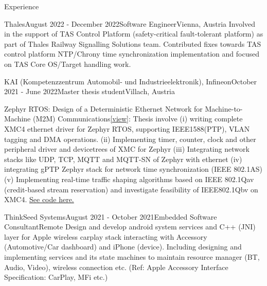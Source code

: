 \documentclass[
	a4paper, %
	11pt, %
]{resume} %
\begin{document}

\begin{rSection}{Experience}

    \begin{rSubsection}{Thales}{August 2022 - December 2022}{Software Engineer}{Vienna, Austria}
        Involved in the support of TAS Control Platform (safety-critical fault-tolerant platform) as part 
        of Thales Railway Signalling Solutions team. Contributed fixes towards TAS control platform NTP/Chrony time 
        synchronization implementation and focused on TAS Core OS/Target handling work.
		
    \end{rSubsection}

	\begin{rSubsection}{KAI (Kompetenzzentrum Automobil- und Industrieelektronik), Infineon}{October 2021 - June 2022}{Master thesis student}{Villach, Austria}

            {\color{orange} Zephyr RTOS: Design of a Deterministic Ethernet Network for Machine-to-Machine (M2M) Communications}\href{https://www.linkedin.com/in/sebinsphilip/overlay/1635506986689/single-media-viewer/?type=DOCUMENT&profileId=ACoAAAm-xe0BCYwezV-q9pIlhl7WYDQHRff8kIE}{[view]}: Thesis involve (i) writing complete XMC4 ethernet driver for Zephyr RTOS, supporting IEEE1588(PTP), VLAN tagging and DMA operations. (ii) Implementing timer, counter, clock and other peripheral driver and devicetrees of XMC for Zephyr (iii) Integrating network stacks like UDP, TCP, MQTT and MQTT-SN of Zephyr with ethernet (iv) integrating gPTP Zephyr stack for network time synchronization (IEEE 802.1AS) (v) Implementing real-time traffic shaping algorithms based on IEEE 802.1Qav (credit-based stream reservation) and investigate feasibility of IEEE802.1Qbv on XMC4.
            \href{https://github.com/sebinsphilip/zephyr\_xmc}{ See code here.}
		
	\end{rSubsection}


	\begin{rSubsection}{ThinkSeed Systems}{August 2021 - October 2021}{Embedded Software Consultant}{Remote}
            Design and develop android system services and C++ (JNI) layer for Apple wireless carplay stack interacting with Accessory (Automotive/Car dashboard) and iPhone (device). Including designing and implementing services and its state machines to maintain resource manager (BT, Audio, Video), wireless connection etc. (Ref: Apple Accessory Interface Specification: CarPlay, MFi etc.)


\end{rSubsection}
\end{rSection}
\end{document}
